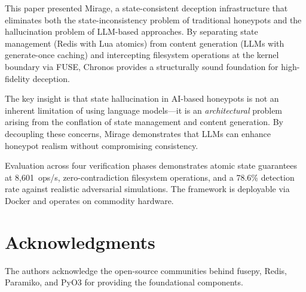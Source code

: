 \documentclass[conference]{IEEEtran}
\begin{document}
This paper presented Mirage, a state-consistent deception infrastructure that eliminates both the state-inconsistency problem of traditional honeypots and the hallucination problem of LLM-based approaches.
By separating state management (Redis with Lua atomics) from content generation (LLMs with generate-once caching) and intercepting filesystem operations at the kernel boundary via FUSE, Chronos provides a structurally sound foundation for high-fidelity deception.

The key insight is that state hallucination in AI-based honeypots is not an inherent limitation of using language models---it is an \emph{architectural} problem arising from the conflation of state management and content generation.
By decoupling these concerns, Mirage demonstrates that LLMs can enhance honeypot realism without compromising consistency.

Evaluation across four verification phases demonstrates atomic state guarantees at 8{,}601~ops/s, zero-contradiction filesystem operations, and a 78.6\% detection rate against realistic adversarial simulations.
The framework is deployable via Docker and operates on commodity hardware.

\section*{Acknowledgments}

The authors acknowledge the open-source communities behind fusepy, Redis, Paramiko, and PyO3 for providing the foundational components.
\end{document}
